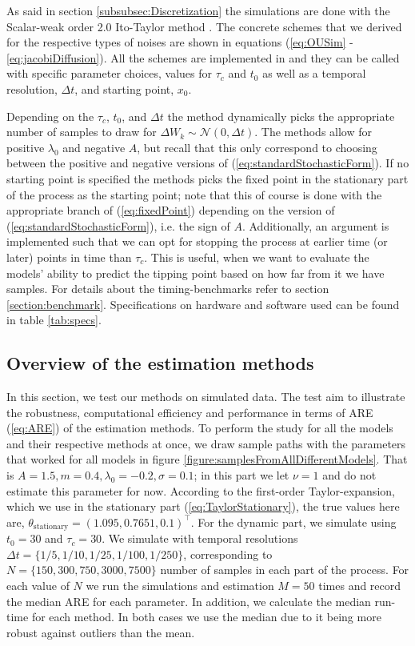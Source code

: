 As said in section \ref{subsubsec:Discretization} the simulations are done with the Scalar-weak order 2.0 Ito-Taylor method \cite[algorithm 8.5]{Srkk2019}. The concrete schemes that we derived for the respective types of noises are shown in equations (\ref{eq:OUSim} - \ref{eq:jacobiDiffusion}). All the schemes are implemented in  and they can be called with specific parameter choices, values for $\tau_c$ and $t_0$ as well as a temporal resolution, $\Delta t$,  and starting point, $x_0$. 

Depending on the $\tau_c$, $t_0$, and $\Delta t$ the method dynamically picks the appropriate number of samples to draw for $\Delta W_k\sim\mathcal{N}\left(0,\Delta t\right)$. The methods allow for positive $\lambda_0$ and negative $A$, but recall that this only correspond to choosing between the positive and negative versions of (\ref{eq:standardStochasticForm}). If no starting point is specified the methods picks the fixed point in the stationary part of the process as the starting point; note that this of course is done with the appropriate branch of (\ref{eq:fixedPoint}) depending on the version of (\ref{eq:standardStochasticForm}), i.e. the sign of $A$. Additionally, an argument is implemented such that we can opt for stopping the process at earlier time (or later) points in time than $\tau_c$. This is useful, when we want to evaluate the models' ability to predict the tipping point based on how far from it we have samples. For details about the timing-benchmarks refer to section \ref{section:benchmark}. Specifications on hardware and software used can be found in table \ref{tab:specs}. 
\subsection{Overview of the estimation methods}
In this section, we test our methods on simulated data. The test aim to illustrate the robustness, computational efficiency and performance in terms of ARE (\ref{eq:ARE}) of the estimation methods. To perform the study for all the models and their respective methods at once, we draw sample paths with the parameters that worked for all models in figure \ref{figure:samplesFromAllDifferentModels}. That is $A = 1.5, m = 0.4, \lambda_0 = -0.2, \sigma = 0.1$; in this part we let $\nu = 1$ and do not estimate this parameter for now. According to the first-order Taylor-expansion, which we use in the stationary part (\ref{eq:TaylorStationary}), the true values here are, $\theta_{\mathrm{stationary}} = (1.095, 0.7651, 0.1)^\top$.  For the dynamic part, we simulate using $t_0 = 30$ and $\tau_c = 30$. We simulate with temporal resolutions $\Delta t = \{1/5, 1/10, 1/25, 1/100, 1/250\}$, corresponding to $N = \{150, 300, 750, 3000, 7500\}$ number of samples in each part of the process. For each value of $N$ we run the simulations and estimation $M = 50$ times and record the median ARE for each parameter. In addition, we calculate the median run-time for each method. In both cases we use the median due to it being more robust against outliers than the mean.

